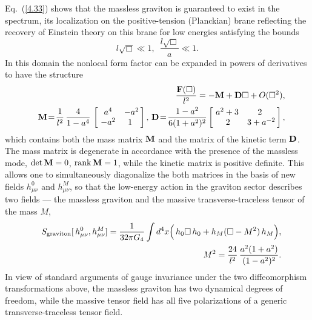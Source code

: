 \documentclass[a4paper,12pt]{article}
\begin{document}
Eq.~(\ref{4.33}) shows that the massless graviton is guaranteed to exist
in the spectrum, its localization on the positive-tension (Planckian)
brane reflecting the recovery of Einstein theory on this brane for
low energies satisfying the bounds
    \begin{equation}
    l\sqrt\Box\ll 1,\,\,\, \frac{l\sqrt\Box}a\ll 1.  \label{4.19}
    \end{equation}
In this domain the nonlocal form factor can be expanded in powers of
derivatives to have the structure
   \begin{eqnarray}
    &&\frac{\bf F(\Box)}{l^2}=
    -{\bf M}+{\bf D}\Box+O(\Box^2),    \label{4.26}\\
    &&{\bf M}\!=\!\frac1{l^2}\,\frac4{1-a^4}\,
    \left[\begin{array}{cc}
    \!a^4 & -a^2\!\! \\
    \!-a^2 & 1 \end{array}\right],\,
    {\bf D}\!=\!\frac{1-a^2}{6(1+a^2)^2}
    \left[\begin{array}{cc}
    \!a^2+3 & 2 \\
    2 & 3+a^{-2}\!\!
    \end{array}\right],                 \label{4.28}
    \end{eqnarray}
which contains both the mass matrix ${\bf M}$ and the
matrix of the kinetic term ${\bf D}$. The mass matrix is
degenerate in accordance with the presence of the massless
mode, ${\rm det}\,{\bf M}=0$, ${\rm rank}\,{\bf M}=1$, while
the kinetic matrix is positive definite. This allows one to
simultaneously diagonalize the both matrices in the basis of
new fields $h^0_{\mu\nu}$ and $h^M_{\mu\nu}$, so that the
low-energy action in the graviton sector describes two fields
--- the massless graviton and the massive transverse-traceless
tensor of the mass $M$,
    \begin{eqnarray}
    &&S_{\rm graviton}[\,h^0_{\mu\nu},h^M_{\mu\nu}]
    =\frac1{32\pi G_4}\int
    d^4x \Big(\,h_0\Box\,h_0
    +h_M(\Box-M^2)\,
    h_M\Big),                  \label{4.31}\\
    &&M^2=\frac{24}{l^2}\,
    \frac{a^2(1+a^2)}{(1-a^2)^2}.  \label{4.30}
    \end{eqnarray}
In view of standard arguments of gauge invariance under the
two diffeomorphism transformations above, the massless graviton has two
dynamical degrees of freedom, while the massive tensor field has
all five polarizations of a generic transverse-traceless tensor
field.
\end{document}
